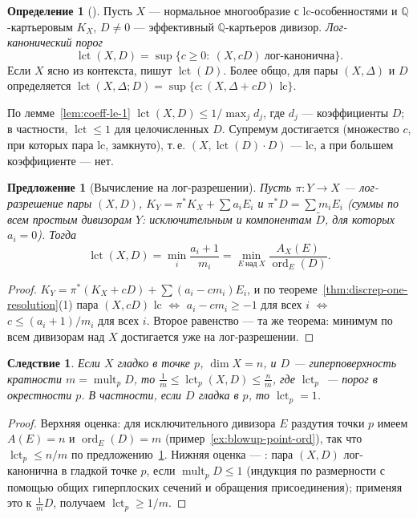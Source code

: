 \documentclass[11pt,a4paper]{article}
\theoremstyle{plain}
\newtheorem{proposition}[theorem]{Предложение}
\newtheorem{corollary}[theorem]{Следствие}
\theoremstyle{definition}
\newtheorem{definition}[theorem]{Определение}
\theoremstyle{remark}
\newcommand{\Q}{\mathbb{Q}}
\DeclareMathOperator{\ord}{ord}
\DeclareMathOperator{\lct}{lct}
\DeclareMathOperator{\mult}{mult}
\begin{document}
\begin{definition}[{\cite[8.1]{KolSing}}]\label{def:lct}
Пусть $X$ --- нормальное многообразие с lc-особенностями и $\Q$-картьеровым $K_X$, $D\ne0$ ---
эффективный $\Q$-картьеров дивизор. \emph{Лог-канонический порог}
\[
\lct(X,D)=\sup\{c\ge0:\ (X,cD)\ \text{лог-канонична}\}.
\]
Если $X$ ясно из контекста, пишут $\lct(D)$. Более общо, для пары $(X,\Delta)$ и $D$ определяется
$\lct(X,\Delta;D)=\sup\{c:(X,\Delta+cD)\text{ lc}\}$.
\end{definition}

По лемме~\ref{lem:coeff-le-1} $\lct(X,D)\le1/\max_jd_j$, где $d_j$ --- коэффициенты $D$; в
частности, $\lct\le1$ для целочисленных $D$. Супремум достигается (множество $c$, при которых пара
lc, замкнуто), т.\,е. $(X,\lct(D)\cdot D)$ --- lc, а при большем коэффициенте --- нет.

\begin{proposition}[Вычисление на лог-разрешении]\label{prop:lct-formula}
Пусть $\pi\colon Y\to X$ --- лог-разрешение пары $(X,D)$, $K_Y=\pi^*K_X+\sum a_iE_i$ и
$\pi^*D=\sum m_iE_i$ (суммы по всем простым дивизорам $Y$: исключительным и компонентам $\tilde D$,
для которых $a_i=0$). Тогда
\[
\lct(X,D)=\min_i\frac{a_i+1}{m_i}=\min_{E\ \text{над}\ X}\frac{A_X(E)}{\ord_E(D)} .
\]
\end{proposition}
\begin{proof}
$K_Y=\pi^*(K_X+cD)+\sum(a_i-cm_i)E_i$, и по теореме~\ref{thm:discrep-one-resolution}(1)
пара $(X,cD)$ lc $\iff$ $a_i-cm_i\ge-1$ для всех $i$ $\iff$ $c\le(a_i+1)/m_i$ для всех $i$.
Второе равенство --- та же теорема: минимум по всем дивизорам над $X$ достигается уже на
лог-разрешении.
\end{proof}

\begin{corollary}\label{cor:lct-mult}
Если $X$ гладко в точке $p$, $\dim X=n$, и $D$ --- гиперповерхность кратности $m=\mult_pD$, то
$\frac1m\le\lct_p(X,D)\le\frac nm$, где $\lct_p$ --- порог в окрестности $p$. В частности, если
$D$ гладка в $p$, то $\lct_p=1$.
\end{corollary}
\begin{proof}
Верхняя оценка: для исключительного дивизора $E$ раздутия точки $p$ имеем $A(E)=n$ и
$\ord_E(D)=m$ (пример~\ref{ex:blowup-point-ord}), так что $\lct_p\le n/m$ по
предложению~\ref{prop:lct-formula}. Нижняя оценка --- \cite[8.10]{KolPairs}: пара $(X,D)$
лог-канонична в гладкой точке $p$, если $\mult_pD\le1$ (индукция по размерности с помощью общих
гиперплоских сечений и обращения присоединения); применяя это к $\frac1mD$, получаем $\lct_p\ge1/m$.
\end{proof}
\end{document}

